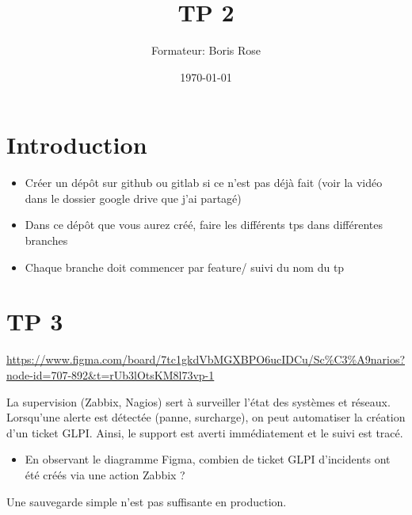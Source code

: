 \documentclass[12pt, letterpaper]{article}
\title{TP 2}
\author{Formateur: Boris Rose}
\date{\today}
\begin{document}
\maketitle

\section*{Introduction}

\begin{tcolorbox}[colback=brown!5,colframe=brown!60!black,title=Consignes]

\begin{itemize}
    \item Créer un dépôt sur github ou gitlab si ce n'est pas déjà fait (voir la vidéo dans le dossier google drive que j'ai partagé)
    \item Dans ce dépôt que vous aurez créé, faire les différents tps dans différentes branches
    \item Chaque branche doit commencer par feature/ suivi du nom du tp 
\end{itemize}


\end{tcolorbox}


\section*{TP 3}


\begin{tcolorbox}[colback=cyan!5,colframe=cyan!60!black,title=Figma du Cours]
    \url{https://www.figma.com/board/7tc1gkdVbMGXBPO6ucIDCu/Sc%C3%A9narios?node-id=707-892&t=rUb3lOtsKM8l73vp-1}
\end{tcolorbox}


\begin{tcolorbox}[colback=brown!5,colframe=brown!60!black,title=Supervision]
    La supervision (Zabbix, Nagios) sert à surveiller l’état des systèmes et réseaux. Lorsqu’une alerte est détectée (panne, surcharge), on peut automatiser la création d’un ticket GLPI. Ainsi, le support est averti immédiatement et le suivi est tracé.
\end{tcolorbox}

\begin{itemize}
    \item En observant le diagramme Figma, combien de ticket GLPI d'incidents ont été créés via une action Zabbix ?
\end{itemize}

\begin{tcolorbox}[colback=brown!5,colframe=brown!60!black,title=Sauvegarde]
Une sauvegarde simple n’est pas suffisante en production. 
\end{tcolorbox}
\end{document}
